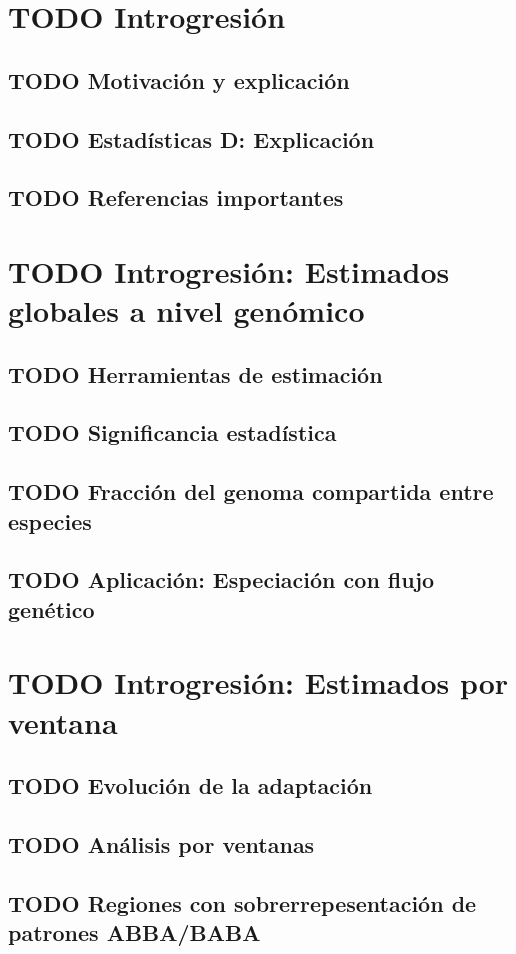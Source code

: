 \documentclass[11pt]{article}
\author{Juan Enciso}
\date{\today}
\title{}
\begin{document}
\tableofcontents

\section{{\bfseries\sffamily TODO} Introgresión}
\label{sec:org9858369}
\subsection{{\bfseries\sffamily TODO} Motivación y explicación}
\label{sec:orgdec2742}
\subsection{{\bfseries\sffamily TODO} Estadísticas D: Explicación}
\label{sec:org5a539dc}
\subsection{{\bfseries\sffamily TODO} Referencias importantes}
\label{sec:org8f2786c}

\section{{\bfseries\sffamily TODO} Introgresión: Estimados globales a nivel genómico}
\label{sec:org0b57582}
\subsection{{\bfseries\sffamily TODO} Herramientas de estimación}
\label{sec:orge8b9e7e}
\subsection{{\bfseries\sffamily TODO} Significancia estadística}
\label{sec:org65b0ef7}
\subsection{{\bfseries\sffamily TODO} Fracción del genoma compartida entre especies}
\label{sec:orge59f75b}
\subsection{{\bfseries\sffamily TODO} Aplicación: Especiación con flujo genético}
\label{sec:org2d3e6f3}

\section{{\bfseries\sffamily TODO} Introgresión: Estimados por ventana}
\label{sec:org648583a}
\subsection{{\bfseries\sffamily TODO} Evolución de la adaptación}
\label{sec:orgab2f79e}
\subsection{{\bfseries\sffamily TODO} Análisis por ventanas}
\label{sec:org55e70c5}
\subsection{{\bfseries\sffamily TODO} Regiones con sobrerrepesentación de patrones ABBA/BABA}
\label{sec:orgb8215ac}
\end{document}
